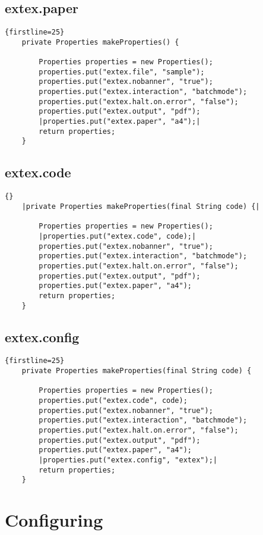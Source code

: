 \subsection{extex.paper}

\begin{lstlisting}{firstline=25}
    private Properties makeProperties() {

        Properties properties = new Properties();
        properties.put("extex.file", "sample");
        properties.put("extex.nobanner", "true");
        properties.put("extex.interaction", "batchmode");
        properties.put("extex.halt.on.error", "false");
        properties.put("extex.output", "pdf");
        |properties.put("extex.paper", "a4");|
        return properties;
    }
\end{lstlisting}

\subsection{extex.code}

\begin{lstlisting}{}
    |private Properties makeProperties(final String code) {|

        Properties properties = new Properties();
        |properties.put("extex.code", code);|
        properties.put("extex.nobanner", "true");
        properties.put("extex.interaction", "batchmode");
        properties.put("extex.halt.on.error", "false");
        properties.put("extex.output", "pdf");
        properties.put("extex.paper", "a4");
        return properties;
    }
\end{lstlisting}

\subsection{extex.config}

\begin{lstlisting}{firstline=25}
    private Properties makeProperties(final String code) {

        Properties properties = new Properties();
        properties.put("extex.code", code);
        properties.put("extex.nobanner", "true");
        properties.put("extex.interaction", "batchmode");
        properties.put("extex.halt.on.error", "false");
        properties.put("extex.output", "pdf");
        properties.put("extex.paper", "a4");
        |properties.put("extex.config", "extex");|
        return properties;
    }
\end{lstlisting}


\section{Configuring \ExTeX{}}


%
